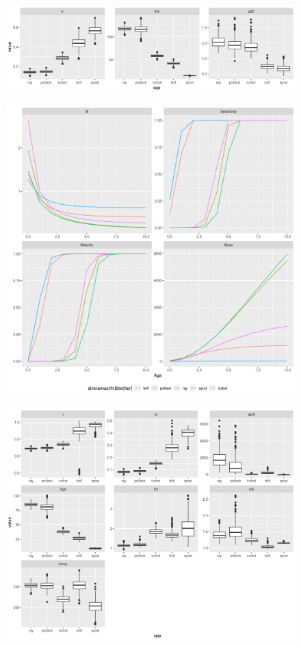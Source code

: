 \documentclass[preprint,12pt]{elsarticle}
\begin{document}
\begin{figure}[]\centering\includegraphics[width=5in]{rg-lhpar-1.png}\caption{}\label{fig:lh}\end{figure}
\begin{figure}[]\centering\includegraphics[width=5in]{rg-vectors-1.png}\caption{}\label{fig:vector}\end{figure}
\begin{figure}[]\centering\includegraphics[width=5in]{rg-derived-1.png}\caption{}\label{fig:lh}\end{figure}
\end{document}
